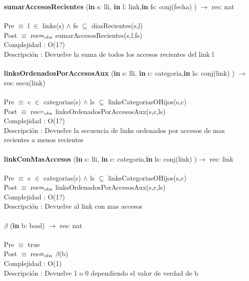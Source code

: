 \documentclass[10pt, a4paper]{article}
\begin{document}
	\textbf{sumarAccesosRecientes} (\textbf{in} s: lli, \textbf{in} l: link,\textbf{in} fs: conj(fecha) ) $\longrightarrow$ res: nat\\\\
	Pre $\equiv$ {l $\in$ links(s)  $\wedge$ fs $\subseteq$ diasRecientes(s,l)}\\
	Post $\equiv$ {res$=_{\mathrm{obs}}$ sumarAccesosRecientes(s,l,fs)}\\
	Complejidad : O(1?)\\
	Descripci\'{o}n : Devuelve la suma de todos los accesos recientes del link l\\\\

	\textbf{linksOrdenadosPorAccesosAux} (\textbf{in} s: lli, \textbf{in} c: categoria,\textbf{in} ls: conj(link) ) $\longrightarrow$ res: secu(link)\\\\
	Pre $\equiv$ {c $\in$ categorias(s)  $\wedge$ ls $\subseteq$ linksCategoriasOHijos(s,c)}\\
	Post $\equiv$ {res$=_{\mathrm{obs}}$ linksOrdenadosPorAccesosAux(s,c,ls)}\\
	Complejidad : O(1?)\\
	Descripci\'{o}n : Devuelve la secuencia de links ordenados por accesos de mas recientes a menos recientes\\\\
	
	\textbf{linkConMasAccesos} (\textbf{in} s: lli, \textbf{in} c: categoria,\textbf{in} ls: conj(link) )$\longrightarrow$ res: link\\\\
	Pre $\equiv$ {c $\in$ categorias(s)  $\wedge$ ls $\subseteq$ linksCategoriasOHijos(s,c)}\\
	Post $\equiv$ {res$=_{\mathrm{obs}}$ linksOrdenadosPorAccesosAux(s,c,ls)}\\
	Complejidad : O(1?)\\
	Descripci\'{o}n : Devuelve al link con mas accesos\\\\
	
	\textbf{$\beta$} (\textbf{in} b: bool) $\longrightarrow$ res: nat\\\\
	Pre $\equiv$ {true}\\
	Post $\equiv$ {res$=_{\mathrm{obs}}$ $\beta$(b)}\\
	Complejidad : O(1)\\
	Descripci\'{o}n : Devuelve 1 o 0 dependiendo el valor de verdad de b\\\\
\end{document}
